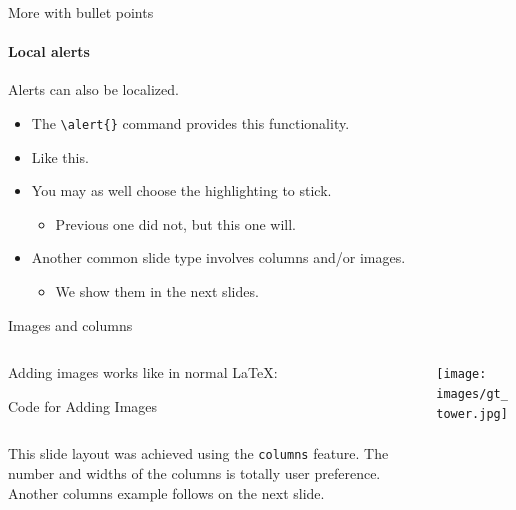 \documentclass{beamer}
\begin{document}
\begin{frame}[fragile]{More with bullet points}
\framesubtitle{Local alerts}
Alerts can also be localized.
\begin{itemize}
\item The \verb|\alert{}| command provides this functionality.
\item Like \alert<2>{this}.
\item You may as well choose the highlighting to stick.
    \begin{itemize}
    \item Previous one did not, but \alert<3->{this one} will.
    \end{itemize}
\item Another common slide type involves columns and/or images.
    \begin{itemize}
    \item We show them in the \alert<4>{next slides}.
    \end{itemize}
\end{itemize}
\end{frame}


\begin{frame}[fragile]{Images and columns}
\begin{columns}
\begin{column}{0.7\textwidth}
Adding images works like in normal \LaTeX:
\begin{block}{Code for Adding Images}
\begin{verbatim}

\end{verbatim}
\end{block}
This slide layout was achieved using the \verb|columns| feature. The number and widths of the columns is totally user preference. Another columns example follows on the next slide.
\end{column}
\begin{column}{0.3\textwidth}
\texttt{[image: images/gt\_tower.jpg]}
\end{column}
\end{columns}
\end{frame}
\end{document}
